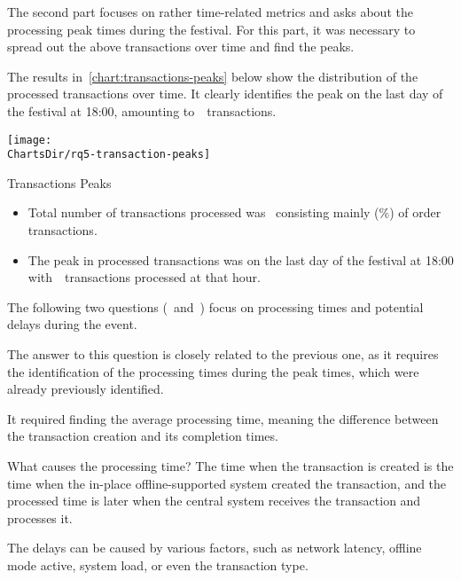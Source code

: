 The second part focuses on rather time-related metrics and asks about the processing peak times during the festival.
For this part, it was necessary to spread out the above transactions over time and find the peaks.

The results in~\autoref{chart:transactions-peaks} below show the distribution of the processed transactions over time.
It clearly identifies the peak on the last day of the festival at 18:00, amounting to~~transactions.

\begin{chart}[H]
	\centering
	\texttt{[image: \\ChartsDir/rq5-transaction-peaks]}
	\caption{ Transactions Peaks}
	\label{chart:transactions-peaks}
	\source
\end{chart}

\begin{keytakeaways}
	\begin{itemize}
		\item Total number of transactions processed was~ consisting mainly (\%) of order transactions.
		\item The peak in processed transactions was on the last day of the festival at 18:00 with~~transactions processed at that hour.
	\end{itemize}
\end{keytakeaways}

The following two questions (~and~) focus on processing times and potential delays during the event.


The answer to this question is closely related to the previous one, as it requires the identification of the processing times during the peak times, which were already previously identified.

\pagebreak[4]

It required finding the average processing time, meaning the difference between the transaction creation and its completion times.

\begin{infobox}{What causes the processing time?}
	The time when the transaction is created is the time when the in-place offline-supported system created the transaction, and the processed time is later when the central system receives the transaction and processes it.

	The delays can be caused by various factors, such as network latency, offline mode active, system load, or even the transaction type.
\end{infobox}

